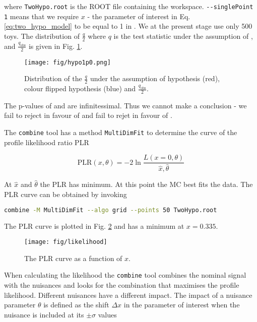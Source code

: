where  \lstinline[language=sh]|TwoHypo.root| is the ROOT file containing the workspace. \lstinline[language=sh]|--singlePoint 1| means that we require $x$ - the parameter of interest in Eq. \ref{eq:two_hypo_model} to be equal to 1 in \Halt. We at the present stage use only 500 toys. The distribution of $\frac{q}{2}$ where $q$ is the test statistic under the assumption of \Hnull, \Halt and $\frac{q_{\text{obs}}}{2}$ is given in Fig. \ref{fig:hypo1p0}.

\begin{figure}
  \centering
  \texttt{[image: fig/hypo1p0.png]}
  \caption{Distribution of the $\frac{q}{2}$ under the assumption of \ttbar hypothesis (red), colour flipped \ttbar hypothesis (blue) and $\frac{q_{\text{obs}}}{2}$.}
  \label{fig:hypo1p0}
\end{figure}

The p-values of \Halt and \Hnull are infinitessimal. Thus we cannot make a conclusion - we fail to reject \Hnull in favour of \Halt and fail to rejet \Halt in favour of \Hnull.

The \lstinline[language=sh]|combine| tool has a method \lstinline[language=sh]|MultiDimFit| to determine the curve of the profile likelihood ratio PLR

\begin{equation}
  \text{PLR}(x, \theta)=-2\ln\frac{L(x=0, \theta)}{\hat{x}, \hat{\theta}}
\end{equation}

At $\hat{x}$ and $\hat{\theta}$ the PLR has minimum. At this point the MC best fits the data. The PLR curve can be obtained by invoking

\begin{lstlisting}[language=sh, breaklines=true]
combine -M MultiDimFit --algo grid --points 50 TwoHypo.root
\end{lstlisting}

The PLR curve is plotted in Fig. \ref{fig:likelihood} and has a minimum at $x=0.335$.

\begin{figure}
  \centering
  \texttt{[image: fig/likelihood]}
  \caption{The PLR curve as a function of $x$.}
  \label{fig:likelihood}
\end{figure}

When calculating the likelihood the \lstinline[language=sh]|combine| tool combines the nominal signal with the nuisances and looks for the combination that maximises the profile likelihood. Different nuisances have a different impact. The impact of a nuisance parameter $\theta$ is defined as the shift $\Delta x$ in the parameter of interest when the nuisance is included at its $\pm\sigma$ values

